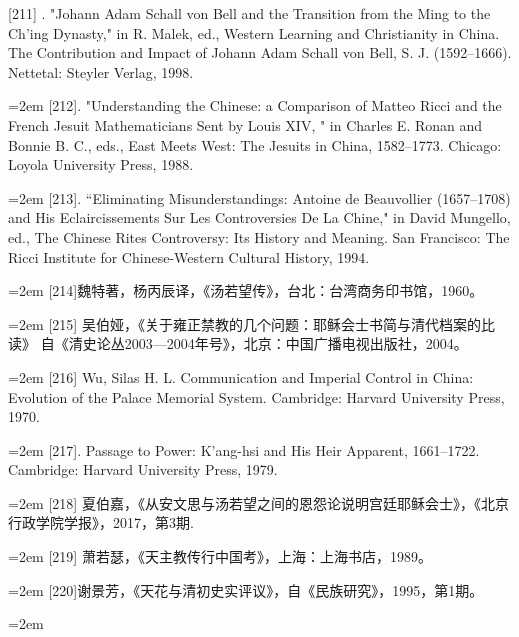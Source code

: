 [211] . "Johann Adam Schall von Bell and the Transition from the Ming to the%
\space%
Ch'ing Dynasty," in R. Malek, ed., Western Learning and Christianity in China.%
\space%
The Contribution and Impact of Johann Adam Schall von Bell, S. J. (1592–1666).%
\space%
Nettetal: Steyler Verlag, 1998.%
\par
\noindent\hangindent=2em
[212]. "Understanding the Chinese: a Comparison of Matteo Ricci and the French%
\space%
Jesuit Mathematicians Sent by Louis XIV, " in Charles E. Ronan and Bonnie B. C.,%
\space%
eds., East Meets West: The Jesuits in China, 1582–1773. Chicago: Loyola University%
\space%
Press, 1988.%
\par
\noindent\hangindent=2em
[213]. “Eliminating Misunderstandings: Antoine de Beauvollier (1657–1708) and%
\space%
His Eclaircissements Sur Les Controversies De La Chine," in David Mungello,%
\space%
ed., The Chinese Rites Controversy: Its History and Meaning. San Francisco: The%
\space%
Ricci Institute for Chinese-Western Cultural History, 1994.%
\par
\noindent\hangindent=2em
[214]魏特著，杨丙辰译，《汤若望传》，台北：台湾商务印书馆，1960。%
\par
\noindent\hangindent=2em
[215] 吴伯娅，《关于雍正禁教的几个问题：耶稣会士书简与清代档案的比读》%
自《清史论丛2003—2004年号》，北京：中国广播电视出版社，2004。%
\par
\noindent\hangindent=2em
[216] Wu, Silas H. L. Communication and Imperial Control in China: Evolution of the%
\space%
Palace Memorial System. Cambridge: Harvard University Press, 1970.%
\par
\noindent\hangindent=2em
[217]. Passage to Power: K'ang-hsi and His Heir Apparent, 1661–1722. Cambridge:%
\space%
Harvard University Press, 1979.%
\par\noindent\hangindent=2em
[218] 夏伯嘉，《从安文思与汤若望之间的恩怨论说明宫廷耶稣会士》，《北京%
行政学院学报》，2017，第3期.%
\par
\noindent\hangindent=2em
[219] 萧若瑟，《天主教传行中国考》，上海：上海书店，1989。%
\par
\noindent\hangindent=2em
[220]谢景芳，《天花与清初史实评议》，自《民族研究》，1995，第1期。%
\par
\noindent\hangindent=2em
